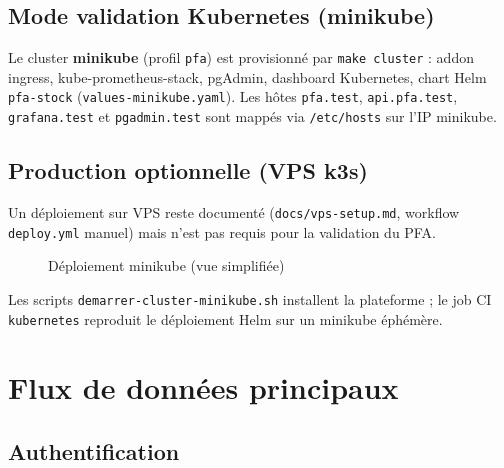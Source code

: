 \subsection{Mode validation Kubernetes (minikube)}

Le cluster \textbf{minikube} (profil \texttt{pfa}) est provisionné par \texttt{make cluster} : addon ingress, kube-prometheus-stack, pgAdmin, dashboard Kubernetes, chart Helm \texttt{pfa-stock} (\texttt{values-minikube.yaml}). Les hôtes \texttt{pfa.test}, \texttt{api.pfa.test}, \texttt{grafana.test} et \texttt{pgadmin.test} sont mappés via \texttt{/etc/hosts} sur l'IP minikube.

\subsection{Production optionnelle (VPS k3s)}

Un déploiement sur VPS reste documenté (\texttt{docs/vps-setup.md}, workflow \texttt{deploy.yml} manuel) mais n'est pas requis pour la validation du PFA.

\begin{figure}[htbp]
  \centering
  \caption{Déploiement minikube (vue simplifiée)}
  \label{fig:k8s}
\end{figure}

Les scripts \texttt{demarrer-cluster-minikube.sh} installent la plateforme ; le job CI \texttt{kubernetes} reproduit le déploiement Helm sur un minikube éphémère.

\section{Flux de données principaux}

\subsection{Authentification}

